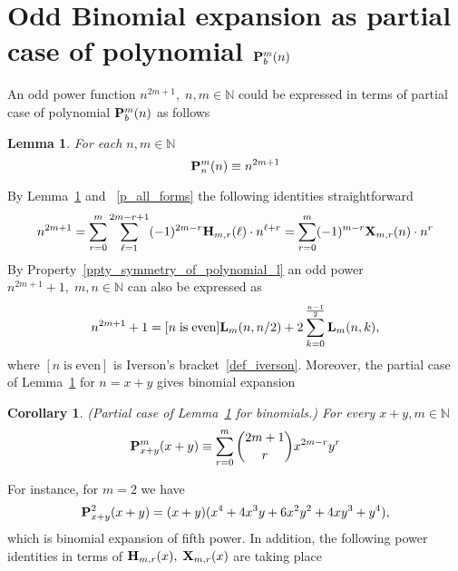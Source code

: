 \documentclass[12pt,letterpaper,oneside,reqno]{amsart}
\newcommand \iversonBracket [1][s]{[#1 \; \mathrm{is} \; \mathrm{even}]}
\newcommand \coeffH [4][H] {{\mathbf{#1}} \sb{#2,#3} (#4)}
\newcommand \polynomialX [4][X] {{\mathbf{#1}}\sb{#2,#3} (#4)}
\newcommand \polynomialP [4][P]{{\mathbf{#1}}\sp{#2} \sb{#3}(#4)}
\newcommand \polynomialL [4][L]{{\mathbf{#1}}\sb{#2}(#3,#4)}
\newtheorem{cor}[thm]{Corollary}
\newtheorem{lem}[thm]{Lemma}
\numberwithin{equation}{section}
\begin{document}
    \section{Odd Binomial expansion as partial case of polynomial
        \texorpdfstring{$\polynomialP{m}{b}{n}$}{P[m,b,n]}}
    An odd power function $n^{2m+1}, \; n,m\in \mathbb{N}$ could be expressed in terms of partial case of
    polynomial $\polynomialP{m}{b}{n}$ as follows
    \begin{lem}
        \label{lemma_polynomial_p_and_odd_power}
        For each $n,m\in\mathbb{N}$
        \begin{equation*}
            \polynomialP{m}{n}{n} \equiv n^{2m+1}
        \end{equation*}
    \end{lem}
    By Lemma~\ref{lemma_polynomial_p_and_odd_power} and ~\eqref{p_all_forms} the following identities straightforward
    \begin{equation*}
        n^{2m+1}
        =\sum_{r=0}^{m} \sum_{\ell=1}^{2m-r+1} (-1)^{2m-r} \coeffH{m}{r}{\ell} \cdot n^{\ell+r}
        =\sum_{r=0}^{m} (-1)^{m-r} \polynomialX{m}{r}{n} \cdot n^r
    \end{equation*}
    By Property~\ref{ppty_symmetry_of_polynomial_l} an odd power $n^{2m+1} + 1, \; m,n\in\mathbb{N}$ can also be
    expressed as
    \begin{equation*}
        n^{2m+1} + 1 = \iversonBracket[n] \polynomialL{m}{n}{n/2} + 2 \sum_{k=0}^{\frac{n-1}{2}} \polynomialL{m}{n}{k},
    \end{equation*}
    where $\iversonBracket[n]$ is Iverson's bracket~\eqref{def_iverson}.
    Moreover, the partial case of Lemma~\ref{lemma_polynomial_p_and_odd_power} for $n = x+y$ gives binomial expansion
    \begin{cor}
        \label{bin_exp_by_p}
        (Partial case of Lemma~\ref{lemma_polynomial_p_and_odd_power} for binomials.)
        For every $x+y,m\in\mathbb{N}$
        \begin{equation*}
            \polynomialP{m}{x+y}{x+y} \equiv \sum_{r=0}^{m} \binom{2m+1}{r} x^{2m-r} y^r
        \end{equation*}
    \end{cor}
    For instance, for $m=2$ we have
    \begin{equation*}
        \polynomialP{2}{x+y}{x+y} = (x + y) (x^4 + 4 x^3 y + 6 x^2 y^2 + 4 x y^3 + y^4),
    \end{equation*}
    which is binomial expansion of fifth power.
    In addition, the following power identities in terms of $\coeffH{m}{r}{x}, \; \polynomialX{m}{r}{x}$ are taking place
\end{document}
